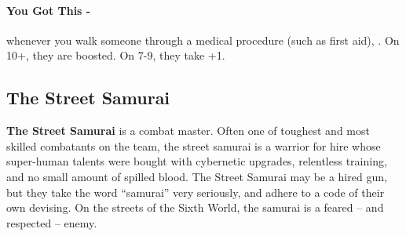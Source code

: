 \paragraph{You Got This -} whenever you walk someone through a medical procedure (such as first aid), . On 10+, they are boosted. On 7-9, they take +1.



\clearpage
\subsection{The Street Samurai}
\textbf{The Street Samurai} is a combat master. Often one of toughest and most skilled combatants on the team, the street samurai is a warrior for hire whose super-human talents were bought with cybernetic upgrades, relentless training, and no small amount of spilled blood. The Street Samurai may be a hired gun, but they take the word “samurai” very seriously, and adhere to a code of their own devising. On the streets of the Sixth World, the samurai is a feared -- and respected -- enemy.

